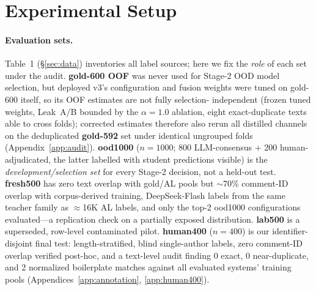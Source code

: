 \section{Experimental Setup}
\label{sec:setup}

\paragraph{Evaluation sets.} Table~1 (\S\ref{sec:data}) inventories all
label sources; here we fix the \emph{role} of each set under the audit.
\textbf{gold-600 OOF} was never used for Stage-2 OOD model selection,
but deployed v3's configuration and fusion weights were tuned on
gold-600 itself, so its OOF estimates are not fully selection-
independent (frozen tuned weights, Leak~A/B bounded by the
$\alpha{=}1.0$ ablation, eight exact-duplicate texts able to cross
folds); corrected estimates therefore also rerun all distilled
channels on the deduplicated \textbf{gold-592} set under identical
ungrouped folds (Appendix~\ref{app:audit}). \textbf{ood1000}
($n{=}1000$; 800 LLM-consensus + 200 human-adjudicated, the latter
labelled with student predictions visible) is the
\emph{development/selection set} for every Stage-2 decision, not a
held-out test. \textbf{fresh500} has zero text overlap with gold/AL
pools but $\sim$70\% comment-ID overlap with corpus-derived training,
DeepSeek-Flash labels from the same teacher family as $\approx$16K AL
labels, and only the top-2 ood1000 configurations evaluated---a
replication check on a partially exposed distribution. \textbf{lab500}
is a superseded, row-level contaminated pilot. \textbf{human400}
($n{=}400$) is our identifier-disjoint final test: length-stratified,
blind single-author labels, zero comment-ID overlap verified
post-hoc, and a text-level audit finding 0 exact, 0 near-duplicate,
and 2 normalized boilerplate matches against all evaluated systems'
training pools (Appendices~\ref{app:annotation}, \ref{app:human400}).

